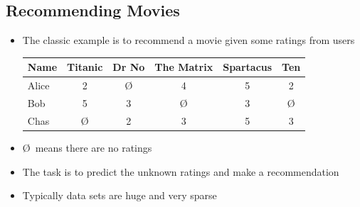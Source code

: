 
\begin{slide}
\section[-2]{Recommending Movies}

\begin{PauseHighLight}
  \begin{itemize}
  \item The classic example is to recommend a movie given some ratings
    from users
    \begin{center}
    \begin{tabular}{|l||c|c|c|c|c|}\hline
      Name & Titanic & Dr No & The Matrix & Spartacus & Ten \\ \hline
      Alice & 2 & \O & 4  & 5 & 2  \\ \hline
      Bob   & 5 & 3  & \O & 3 & \O \\ \hline
      Chas  & \O & 2 & 3 & 5 & 3 \\ \hline
    \end{tabular}\pause
    \end{center}
  \item \O\ means there are no ratings\pause
  \item The task is to predict the unknown ratings and make a
    recommendation\pause
  \item Typically data sets are huge and very sparse\pause
  \end{itemize}
\end{PauseHighLight}

\end{slide}



